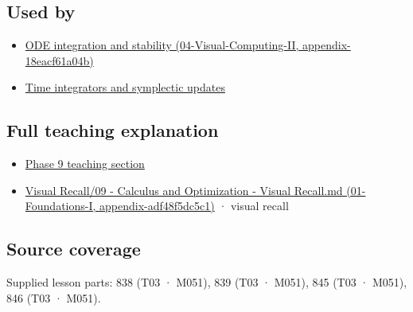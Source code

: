 \subsection{Used by}\label{appendix-e8ab9836882e-used-by}

\begin{itemize}
\tightlist
\item
  \href{../04-Visual-Computing-II/main.pdf\#nameddest=appendix-18eacf61a04b}{ODE integration and stability (04-Visual-Computing-II, appendix-18eacf61a04b)}
\item
  \hyperref[appendix-8f96f9c4d5bc]{Time integrators and symplectic updates}
\end{itemize}

\subsection{Full teaching explanation}\label{appendix-e8ab9836882e-full-teaching-explanation}

\begin{itemize}
\tightlist
\item
  \hyperref[02-foundations-ii-ch025-odes-and-numerical-simulation]{Phase 9 teaching section}
\item
  \href{../01-Foundations-I/main.pdf\#nameddest=appendix-adf48f5dc5c1}{Visual Recall/09 - Calculus and Optimization - Visual Recall.md (01-Foundations-I, appendix-adf48f5dc5c1)} · visual recall
\end{itemize}

\subsection{Source coverage}\label{appendix-e8ab9836882e-source-coverage}

Supplied lesson parts: 838 (T03 · M051), 839 (T03 · M051), 845 (T03 · M051), 846 (T03 · M051).
